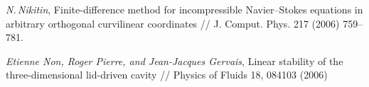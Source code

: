 \begin{thebibliography}{99}

  \textit{N.\,Nikitin}, Finite-difference method for incompressible Navier–Stokes equations in 
  arbitrary orthogonal curvilinear coordinates // J. Comput. Phys. 217 (2006) 759–781.

  \textit{Etienne Non, Roger Pierre, and Jean-Jacques Gervais}, Linear stability of the 
  three-dimensional lid-driven cavity // Physics of Fluids 18, 084103 (2006)

\end{thebibliography}
